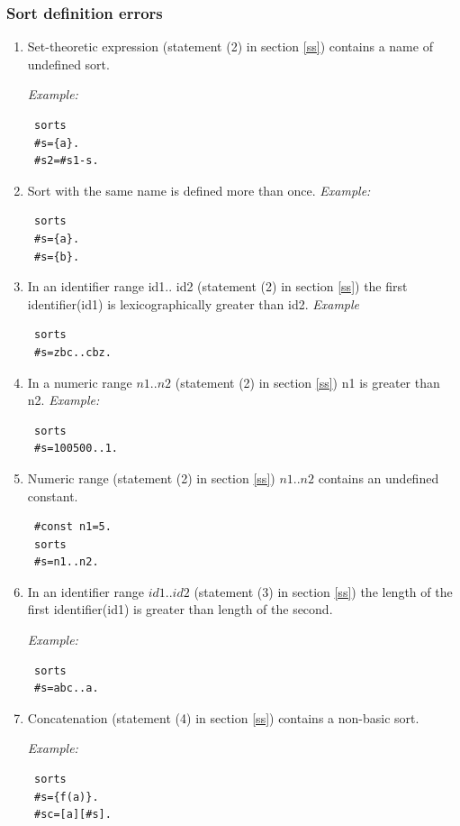 \documentclass[12pt, letterpaper]{article}
\begin{document}
\subsubsection{Sort definition errors}
\begin{enumerate}
\item  Set-theoretic expression (statement (2) in section \ref{ss}) contains a name of undefined sort.

\textit{Example:}
\begin{verbatim}
 sorts
 #s={a}.
 #s2=#s1-s.
\end{verbatim}

\item  Sort with the same name is defined more than once.
\textit{Example:}
\begin{verbatim}
 sorts
 #s={a}.
 #s={b}.
\end{verbatim}

\item In an identifier range id1.. id2 (statement (2) in section \ref{ss}) the first identifier(id1) is lexicographically greater than id2.
\textit{Example}
\begin{verbatim}
 sorts
 #s=zbc..cbz.
\end{verbatim}

\item In a numeric range $n1..n2$ (statement (2) in section \ref{ss})  n1 is greater than n2.
\textit{Example:}
\begin{verbatim}
 sorts
 #s=100500..1.
\end{verbatim}


\item Numeric range (statement (2) in section \ref{ss}) $n1..n2$  contains an undefined constant.

\begin{verbatim}
 #const n1=5.
 sorts
 #s=n1..n2.
\end{verbatim}

\item In an identifier range $id1..id2$ (statement (3) in section \ref{ss})  the length of the first identifier(id1) is greater than length of the second. 


\textit{Example:}
\begin{verbatim}
 sorts
 #s=abc..a.
\end{verbatim}

\item Concatenation (statement  (4) in section \ref{ss}) contains a non-basic sort.

\textit{Example:}
\begin{verbatim}
 sorts
 #s={f(a)}.
 #sc=[a][#s].
\end{verbatim}




\end{enumerate}
\end{document}
